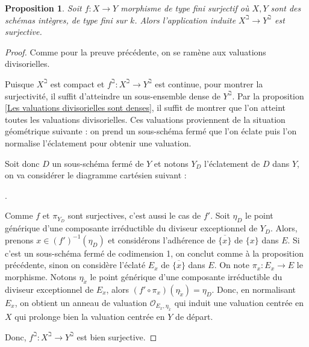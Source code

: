 \documentclass[11pt]{article}
\newtheorem{prop}[thm]{Proposition}
\begin{document}
\begin{prop}\label{si le morphisme est surjectif, surjectivité des beth}
Soit $f : X \rightarrow Y$ morphisme de type fini surjectif où $X, Y$ sont des schémas intègres, de type fini sur $k$. Alors l'application induite $X^\beth \rightarrow Y^\beth$ est surjective. 
\end{prop}

\begin{proof}

Comme pour la preuve précédente, on se ramène aux valuations divisorielles.

Puisque $X^\beth$ est compact et $f^\beth :  X^\beth \rightarrow Y^\beth$ est continue, pour montrer la surjectivité, il suffit d'atteindre un sous-ensemble dense de $Y^\beth$. Par la proposition \ref{Les valuations divisorielles sont denses}, il suffit de montrer que l'on atteint toutes les valuations divisorielles. Ces valuations proviennent de la situation géométrique suivante : on prend un sous-schéma fermé que l'on éclate puis l'on normalise l'éclatement pour obtenir une valuation. 

Soit donc $D$ un sous-schéma fermé de $Y$ et notons $Y_D$ l'éclatement de $D$ dans $Y$, on va considérer le diagramme cartésien suivant :
.

Comme $f$ et $\pi_{Y_D}$ sont surjectives, c'est aussi le cas de $f'$. Soit $\eta_D$ le point générique d'une composante irréductible du diviseur exceptionnel de $Y_D$. Alors, prenons $x \in (f')^{-1}(\eta_D)$ et considérons l'adhérence de $\overline{\lbrace x\rbrace}$ de $\lbrace x \rbrace$ dans $E$. Si c'est un sous-schéma fermé de codimension 1, on conclut comme à la proposition précédente, sinon on considère l'éclaté $E_x$ de $\overline{\lbrace x\rbrace}$ dans $E$. On note $\pi_x : E_x \rightarrow E$ le morphisme. Notons $\eta_{\tilde{x}}$ le point générique d'une composante irréductible du diviseur exceptionnel de $E_x$, alors $(f'\circ \pi_x) (\eta_{\tilde{x}}) = \eta_D$. Donc, en normalisant $E_x$, on obtient un anneau de valuation $\mathcal{O}_{E_x, \eta_{\tilde{x}}}$ qui induit une valuation centrée en $X$ qui prolonge bien la valuation centrée en $Y$ de départ. 

Donc, $f^\beth : X^\beth \rightarrow Y^\beth$ est bien surjective. 
\end{proof}
\end{document}
